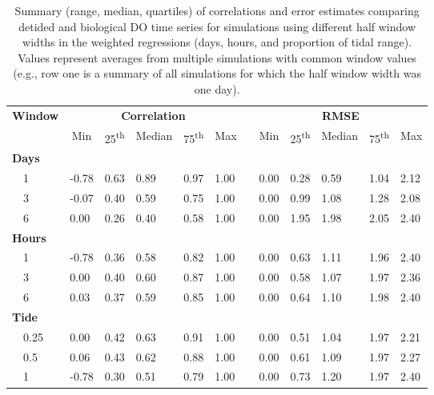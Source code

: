 \documentclass[letterpaper,12pt,oneside]{article}\usepackage[]{graphicx}\usepackage[]{color}
\begin{document}
%
\begin{table}[!tbp]
\caption{Summary (range, median, quartiles) of correlations and error estimates comparing detided and biological \ac{DO} time series for simulations using different half window widths in the weighted regressions (days, hours, and proportion of tidal range).  Values represent averages from multiple simulations with common window values (e.g., row one is a summary of all simulations for which the half window width was one day).\label{tab:dtd_perf2}} 
\begin{center}
\begin{tabular}{llllllclllll}
\hline\hline
\multicolumn{1}{l}{\bfseries Window}&\multicolumn{5}{c}{\bfseries Correlation}&\multicolumn{1}{c}{\bfseries }&\multicolumn{5}{c}{\bfseries RMSE}\tabularnewline
\cline{2-6} \cline{8-12}
\multicolumn{1}{l}{}&\multicolumn{1}{c}{Min}&\multicolumn{1}{c}{25\textsuperscript{th}}&\multicolumn{1}{c}{Median}&\multicolumn{1}{c}{75\textsuperscript{th}}&\multicolumn{1}{c}{Max}&\multicolumn{1}{c}{}&\multicolumn{1}{c}{Min}&\multicolumn{1}{c}{25\textsuperscript{th}}&\multicolumn{1}{c}{Median}&\multicolumn{1}{c}{75\textsuperscript{th}}&\multicolumn{1}{c}{Max}\tabularnewline
\hline
{\bfseries Days}&&&&&&&&&&&\tabularnewline
~~1&-0.78&0.63&0.89&0.97&1.00&&0.00&0.28&0.59&1.04&2.12\tabularnewline
~~3&-0.07&0.40&0.59&0.75&1.00&&0.00&0.99&1.08&1.28&2.08\tabularnewline
~~6& 0.00&0.26&0.40&0.58&1.00&&0.00&1.95&1.98&2.05&2.40\tabularnewline
\hline
{\bfseries Hours}&&&&&&&&&&&\tabularnewline
~~1&-0.78&0.36&0.58&0.82&1.00&&0.00&0.63&1.11&1.96&2.40\tabularnewline
~~3& 0.00&0.40&0.60&0.87&1.00&&0.00&0.58&1.07&1.97&2.36\tabularnewline
~~6& 0.03&0.37&0.59&0.85&1.00&&0.00&0.64&1.10&1.98&2.40\tabularnewline
\hline
{\bfseries Tide}&&&&&&&&&&&\tabularnewline
~~0.25& 0.00&0.42&0.63&0.91&1.00&&0.00&0.51&1.04&1.97&2.21\tabularnewline
~~0.5& 0.06&0.43&0.62&0.88&1.00&&0.00&0.61&1.09&1.97&2.27\tabularnewline
~~1&-0.78&0.30&0.51&0.79&1.00&&0.00&0.73&1.20&1.97&2.40\tabularnewline
\hline
\end{tabular}
\end{center}
\end{table}
\end{document}

